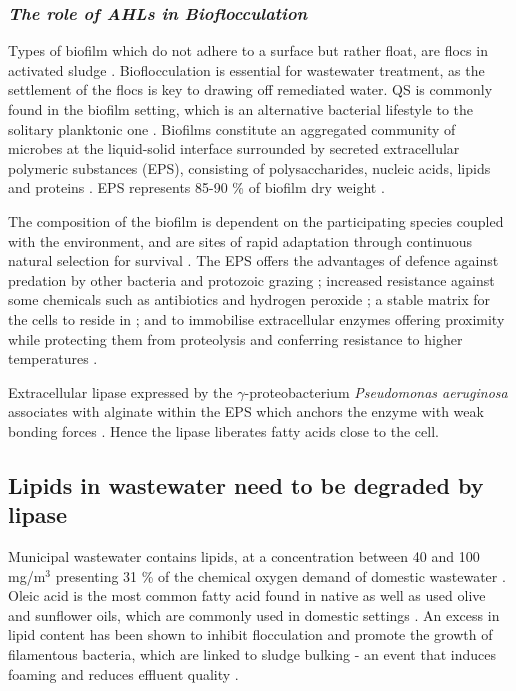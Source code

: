 \documentclass[11pt]{article}
\begin{document}
\subsubsection{\emph{The role of AHLs in Bioflocculation}}
Types of biofilm which do not adhere to a surface but rather float, are flocs in activated sludge \cite{wingender1999}. Bioflocculation is essential for wastewater treatment, as the settlement of the flocs is key to drawing off remediated water. QS is commonly found in the biofilm setting, which is an alternative bacterial lifestyle to the solitary planktonic one \cite{webb2003}. Biofilms constitute an aggregated community of microbes at the liquid-solid interface surrounded by secreted extracellular polymeric substances (EPS), consisting of polysaccharides, nucleic acids, lipids and proteins \cite{wingender1999}. EPS represents 85-90 \% of biofilm dry weight \cite{Frolund_96}.


The composition of the biofilm is dependent on the participating species coupled with the environment, and are sites of rapid adaptation through continuous natural selection for survival \cite{boles2008,matz2005,palmer2001}.  
The EPS offers the advantages of defence against predation by other bacteria \cite{rao2005} and protozoic grazing \cite{matz2005}; increased resistance against some chemicals such as antibiotics and hydrogen peroxide \cite{burmolle_06}; a stable matrix for the cells to reside in \cite{Flemming_10}; and to immobilise extracellular enzymes offering proximity while protecting them from proteolysis and conferring resistance to higher temperatures \cite{wingender2002extracellular,Flemming_10,skillman1998}.

Extracellular lipase expressed by the \emph{$\gamma$}-proteobacterium \textit{Pseudomonas aeruginosa} associates with alginate within the EPS which anchors the enzyme with weak bonding forces \cite{mayer1999role,wicker1987}. Hence the lipase  liberates fatty acids close to the cell.

\subsection{Lipids in wastewater need to be degraded by lipase}
Municipal wastewater contains lipids, at a concentration between 40 and 100 mg/m$^{3}$ \cite{Forster_92} presenting 31 \% of the chemical oxygen demand of domestic wastewater \cite{Raunkjaer_94}. Oleic acid is the most common fatty acid found in native as well as used olive and sunflower oils, which are commonly used in domestic settings \cite{haba2000isolation}.  An excess in lipid content has been shown to inhibit flocculation and promote the growth of filamentous bacteria, which are linked to sludge bulking - an event that induces foaming and reduces effluent quality \cite{Forster_92}.
\end{document}
